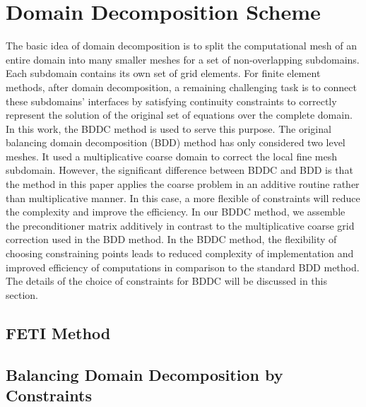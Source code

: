 \section{Domain Decomposition Scheme}
The basic idea of domain decomposition is to split the computational mesh of an entire domain into many smaller meshes for a set of non-overlapping subdomains. Each subdomain contains its own set of grid elements. For finite element methods, after domain decomposition, a remaining challenging task is to connect these subdomains' interfaces by satisfying continuity constraints to correctly represent the solution of the original set of equations over the complete domain. In this work, the BDDC method is used to serve this purpose. The original balancing domain decomposition (BDD) method \cite{mandel1993balancing} has only considered two level meshes. It used a multiplicative coarse domain to correct the local fine mesh subdomain. However, the significant difference between BDDC and BDD is that the method in this paper applies the coarse problem in an additive routine rather than multiplicative manner. In this case, a more flexible of constraints will reduce the complexity and improve the efficiency. In our BDDC method, we assemble the preconditioner matrix additively in contrast to the multiplicative coarse grid correction used in the BDD method. In the BDDC method, the flexibility of choosing constraining points leads to reduced complexity of implementation and improved efficiency of computations in comparison to the standard BDD method. The details of the choice of constraints for BDDC will be discussed in this section.

\subsection{FETI Method}

\subsection{Balancing Domain Decomposition by Constraints}

